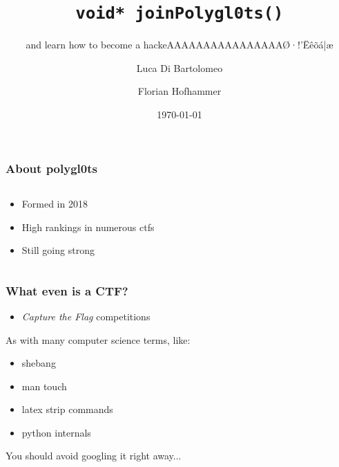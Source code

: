 \documentclass[aspectratio=169]{beamer}
\title{\texttt{void* joinPolygl0ts()}}
\subtitle{and learn how to become a hackeAAAAAAAAAAAAAAAAØ·!'Ëêõá|æ}
\author{Luca Di Bartolomeo \and Florian Hofhammer}
\date{\today}
\begin{document}
  
\titleframe

\begin{frame}
    \frametitle{About polygl0ts}
    \begin{columns}
        \begin{column}{0.5\textwidth}
            \begin{itemize}
                \item Formed in 2018
				\item High rankings in numerous ctfs
				\item Still going strong
            \end{itemize}
        \end{column}
        \begin{column}{0.5\textwidth}
            
        \end{column}
    \end{columns}
\end{frame}

\begin{frame}
	\frametitle{What even is a CTF?}
	\begin{itemize}
		\item \textit{Capture the Flag} competitions
	\end{itemize}
	\pause
	\vspace{2em}
	As with many computer science terms, like:
	\begin{itemize}
		\item shebang
		\item man touch
		\item latex strip commands
		\item python internals
	\end{itemize}
	You should avoid googling it right away...
\end{frame}
\end{document}
